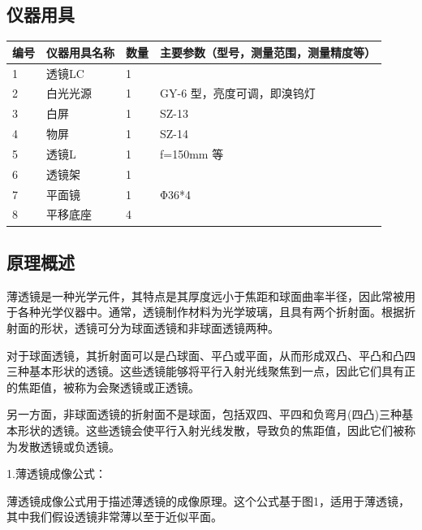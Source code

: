 \documentclass[dvipsnames, svgnames,a4paper,11pt]{article}
\begin{document}
	\subsection{仪器用具}
	\begin{table}[htbp]
		\centering
		\renewcommand\arraystretch{1.6}
		\begin{tabular}{p{}|p{}|p{}|p{}}
			\hline
			编号& 仪器用具名称 & 数量 &  主要参数（型号，测量范围，测量精度等） \\
			\hline
			1& 透镜LC &1 & \\
			
			2& 白光光源 &1 & GY-6 型，亮度可调，即溴钨灯 \\
			
			3& 白屏 & 1 & SZ-13 \\
			
			4& 物屏 & 1 & SZ-14 \\
			
			5& 透镜L & 1 & f=150mm 等 \\
			
			6& 透镜架 & 1 & \\
			
			7& 平面镜 & 1 & Φ36*4 \\
			
			8& 平移底座 & 4 & \\
			\hline
		\end{tabular}
	\end{table}
	
	\subsection{原理概述}
	薄透镜是一种光学元件，其特点是其厚度远小于焦距和球面曲率半径，因此常被用于各种光学仪器中。通常，透镜制作材料为光学玻璃，且具有两个折射面。根据折射面的形状，透镜可分为球面透镜和非球面透镜两种。
	
	对于球面透镜，其折射面可以是凸球面、平凸或平面，从而形成双凸、平凸和凸四三种基本形状的透镜。这些透镜能够将平行入射光线聚焦到一点，因此它们具有正的焦距值，被称为会聚透镜或正透镜。
	
	另一方面，非球面透镜的折射面不是球面，包括双四、平四和负弯月(四凸)三种基本形状的透镜。这些透镜会使平行入射光线发散，导致负的焦距值，因此它们被称为发散透镜或负透镜。
	
	1.薄透镜成像公式：
	
	薄透镜成像公式用于描述薄透镜的成像原理。这个公式基于图1，适用于薄透镜，其中我们假设透镜非常薄以至于近似平面。
	
\end{document}
